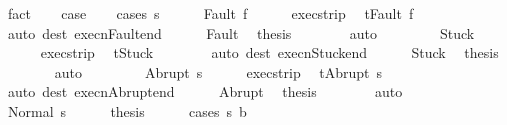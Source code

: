 \begin{isabellebody}
\ fact\isanewline
\ \ \isamarkupfalse%
\ {\isacharquery}case\isanewline
\ \ \isamarkupfalse%
\ {\isacharparenleft}cases\ s{\isacharparenright}\isanewline
\ \ \ \ \isamarkupfalse%
\ {\isacharparenleft}Fault\ f{\isacharparenright}\isanewline
\ \ \ \ \isamarkupfalse%
\ exec{\isacharunderscore}strip\ \isamarkupfalse%
\ {\isachardoublequoteopen}t{\isacharequal}Fault\ f{\isachardoublequoteclose}\isanewline
\ \ \ \ \ \ \isamarkupfalse%
\ {\isacharparenleft}auto\ dest{\isacharcolon}\ execn{\isacharunderscore}Fault{\isacharunderscore}end{\isacharparenright}\isanewline
\ \ \ \ \isamarkupfalse%
\ Fault\ \isamarkupfalse%
\ {\isacharquery}thesis\isanewline
\ \ \ \ \ \ \isamarkupfalse%
\ auto\isanewline
\ \ \isamarkupfalse%
\isanewline
\ \ \ \ \isamarkupfalse%
\ Stuck\isanewline
\ \ \ \ \isamarkupfalse%
\ exec{\isacharunderscore}strip\ \isamarkupfalse%
\ {\isachardoublequoteopen}t{\isacharequal}Stuck{\isachardoublequoteclose}\isanewline
\ \ \ \ \ \ \isamarkupfalse%
\ {\isacharparenleft}auto\ dest{\isacharcolon}\ execn{\isacharunderscore}Stuck{\isacharunderscore}end{\isacharparenright}\isanewline
\ \ \ \ \isamarkupfalse%
\ Stuck\ \isamarkupfalse%
\ {\isacharquery}thesis\isanewline
\ \ \ \ \ \ \isamarkupfalse%
\ auto\isanewline
\ \ \isamarkupfalse%
\isanewline
\ \ \ \ \isamarkupfalse%
\ {\isacharparenleft}Abrupt\ s{\isacharprime}{\isacharparenright}\isanewline
\ \ \ \ \isamarkupfalse%
\ exec{\isacharunderscore}strip\ \isamarkupfalse%
\ {\isachardoublequoteopen}t{\isacharequal}Abrupt\ s{\isacharprime}{\isachardoublequoteclose}\isanewline
\ \ \ \ \ \ \isamarkupfalse%
\ {\isacharparenleft}auto\ dest{\isacharcolon}\ execn{\isacharunderscore}Abrupt{\isacharunderscore}end{\isacharparenright}\isanewline
\ \ \ \ \isamarkupfalse%
\ Abrupt\ \isamarkupfalse%
\ {\isacharquery}thesis\isanewline
\ \ \ \ \ \ \isamarkupfalse%
\ auto\isanewline
\ \ \isamarkupfalse%
\isanewline
\ \ \ \ \isamarkupfalse%
\ {\isacharparenleft}Normal\ s{\isacharprime}{\isacharparenright}\isanewline
\ \ \ \ \isamarkupfalse%
\ {\isacharquery}thesis\isanewline
\ \ \ \ \isamarkupfalse%
\ {\isacharparenleft}cases\ {\isachardoublequoteopen}s{\isacharprime}{\isasymin}\ b{\isachardoublequoteclose}{\isacharparenright}\isanewline

\end{isabellebody}
